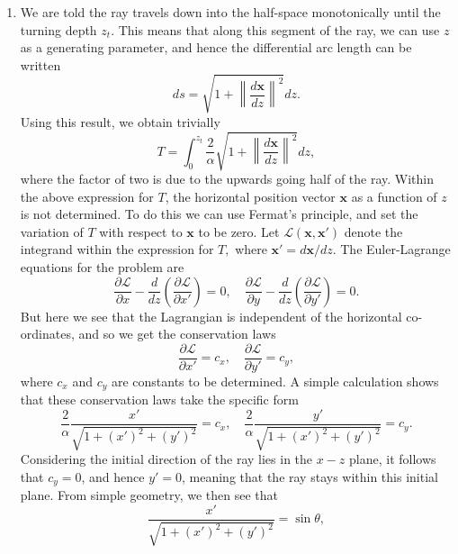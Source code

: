 \documentclass[a4paper,10pt]{paper}
\begin{document}
\begin{enumerate}
\item We are told the ray travels down into the half-space monotonically until the turning depth $z_{t}$. This means that along this segment of the ray, we can use $z$ as a generating parameter, and hence the differential arc length can be written
\begin{equation*}
    ds=\sqrt{1+\left\|\frac{d\mathbf{x}}{dz}\right\|^{2}}dz.
\end{equation*}
Using this result, we obtain trivially
\begin{equation*}
    T=\int_{0}^{z_{t}}\frac{2}{\alpha}\sqrt{1+\left\|\frac{d\mathbf{x}}{dz}\right\|^{2}}dz,
\end{equation*}
where the factor of two is due to the upwards going half of the ray. Within the above expression for $T$, the horizontal position vector $\mathbf{x}$ as a function of $z$ is not determined. To do this we can use Fermat's principle, and set the variation of $T$ with respect to $\mathbf{x}$ to be zero. Let $\mathscr{L}(\mathbf{x},\mathbf{x}')$ denote the integrand within the expression for $T,$ where $\mathbf{x}'=d\mathbf{x}/dz$. The Euler-Lagrange equations for the problem are
\begin{equation*}
    \frac{\partial\mathscr{L}}{\partial x}-\frac{d}{dz}\left(\frac{\partial\mathscr{L}}{\partial x'}\right)=0, \quad \frac{\partial\mathscr{L}}{\partial y}-\frac{d}{dz}\left(\frac{\partial\mathscr{L}}{\partial y'}\right)=0.
\end{equation*}
But here we see that the Lagrangian is independent of the horizontal co-ordinates, and so we get the conservation laws
\begin{equation*}
    \frac{\partial\mathscr{L}}{\partial x'}=c_{x}, \quad \frac{\partial\mathscr{L}}{\partial y'}=c_{y},
\end{equation*}
where $c_{x}$ and $c_{y}$ are constants to be determined. A simple calculation shows that these conservation laws take the specific form
\begin{equation*}
    \frac{2}{\alpha}\frac{x'}{\sqrt{1+(x')^{2}+(y')^{2}}}=c_{x},\quad \frac{2}{\alpha}\frac{y'}{\sqrt{1+(x')^{2}+(y')^{2}}}=c_{y}.
\end{equation*}
Considering the initial direction of the ray lies in the $x-z$ plane, it follows that $c_{y}=0$, and hence $y'=0$, meaning that the ray stays within this initial plane. From simple geometry, we then see that
\begin{equation*}
    \frac{x'}{\sqrt{1+(x')^{2}+(y')^{2}}}=\sin\theta,
\end{equation*}

\end{enumerate}
\end{document}
